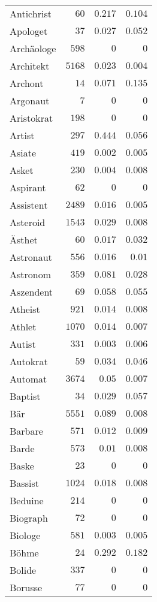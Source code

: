 \begin{supertabular}{lrrr}
Antichrist & $60$ & $0.217$ & $0.104$ \\
Apologet & $37$ & $0.027$ & $0.052$ \\
Archäologe & $598$ & $0$ & $0$ \\
Architekt & $5168$ & $0.023$ & $0.004$ \\
Archont & $14$ & $0.071$ & $0.135$ \\
Argonaut & $7$ & $0$ & $0$ \\
Aristokrat & $198$ & $0$ & $0$ \\
Artist & $297$ & $0.444$ & $0.056$ \\
Asiate & $419$ & $0.002$ & $0.005$ \\
Asket & $230$ & $0.004$ & $0.008$ \\
Aspirant & $62$ & $0$ & $0$ \\
Assistent & $2489$ & $0.016$ & $0.005$ \\
Asteroid & $1543$ & $0.029$ & $0.008$ \\
Ästhet & $60$ & $0.017$ & $0.032$ \\
Astronaut & $556$ & $0.016$ & $0.01$ \\
Astronom & $359$ & $0.081$ & $0.028$ \\
Aszendent & $69$ & $0.058$ & $0.055$ \\
Atheist & $921$ & $0.014$ & $0.008$ \\
Athlet & $1070$ & $0.014$ & $0.007$ \\
Autist & $331$ & $0.003$ & $0.006$ \\
Autokrat & $59$ & $0.034$ & $0.046$ \\
Automat & $3674$ & $0.05$ & $0.007$ \\
Baptist & $34$ & $0.029$ & $0.057$ \\
Bär & $5551$ & $0.089$ & $0.008$ \\
Barbare & $571$ & $0.012$ & $0.009$ \\
Barde & $573$ & $0.01$ & $0.008$ \\
Baske & $23$ & $0$ & $0$ \\
Bassist & $1024$ & $0.018$ & $0.008$ \\
Beduine & $214$ & $0$ & $0$ \\
Biograph & $72$ & $0$ & $0$ \\
Biologe & $581$ & $0.003$ & $0.005$ \\
Böhme & $24$ & $0.292$ & $0.182$ \\
Bolide & $337$ & $0$ & $0$ \\
Borusse & $77$ & $0$ & $0$ \\

\end{supertabular}
